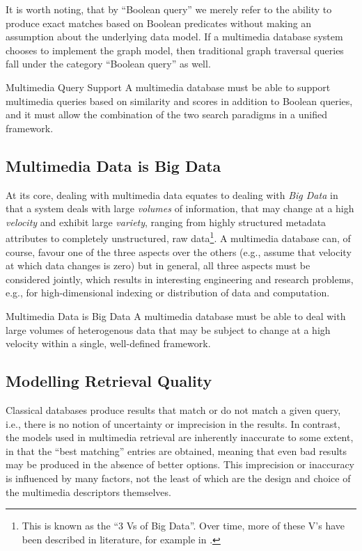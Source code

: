 It is worth noting, that by ``Boolean query'' we merely refer to the ability to produce exact matches based on Boolean predicates without making an assumption about the underlying data model. If a multimedia database system chooses to implement the graph model, then traditional graph traversal queries fall under the category ``Boolean query'' as well.

\begin{requirement}[label=requirement:multimedia_search]{Multimedia Query Support}{}
    A multimedia database must be able to support multimedia queries based on similarity and scores in addition to Boolean queries, and it must allow the combination of the two search paradigms in a unified framework.
\end{requirement}

\subsection{Multimedia Data is Big Data}
At its core, dealing with multimedia data equates to dealing with \emph{Big Data} in that a system deals with large \emph{volumes} of information, that may change at a high \emph{velocity} and exhibit large \emph{variety}, ranging from highly structured metadata attributes to completely unstructured, raw data\footnote{This is known as the ``3 Vs of Big Data''. Over time, more of these V's have been described in literature, for example in \cite{Khan:2014Seven}.}. A multimedia database can, of course, favour one of the three aspects over the others (e.g., assume that velocity at which data changes is zero) but in general, all three aspects must be considered jointly, which results in interesting engineering and research problems, e.g., for high-dimensional indexing \cite{Hojsgaard:2019Index} or distribution of data and computation.

\begin{requirement}[label=requirement:big_data]{Multimedia Data is Big Data}{}
    A multimedia database must be able to deal with large volumes of heterogenous data that may be subject to change at a high velocity within a single, well-defined framework.
\end{requirement}

\subsection{Modelling Retrieval Quality}

Classical databases produce results that match or do not match a given query, i.e., there is no notion of uncertainty or imprecision in the results. In contrast, the models used in multimedia retrieval are inherently inaccurate to some extent, in that the ``best matching'' entries are obtained, meaning that even bad results may be produced in the absence of better options. This imprecision or inaccuracy is influenced by many factors, not the least of which are the design and choice of the multimedia descriptors themselves.

